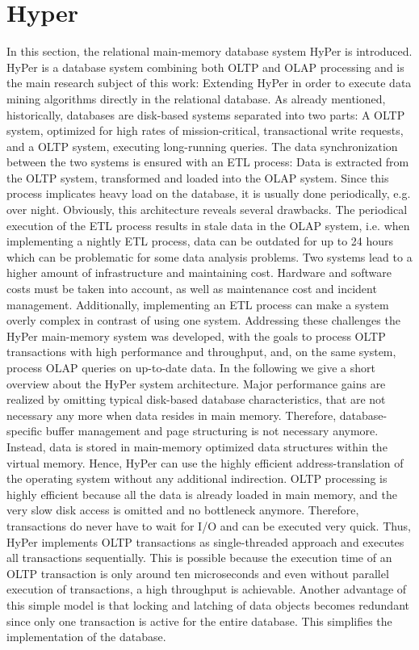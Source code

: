 \chapter{Hyper}\label{chapter:hyper}

In this section, the relational main-memory database system HyPer is introduced. HyPer is a database system combining both OLTP and OLAP processing and is the main research subject of this work: Extending HyPer in order to execute data mining algorithms directly in the relational database.
As already mentioned, historically, databases are disk-based systems separated into two parts: A OLTP system, optimized for high rates of mission-critical, transactional write requests, and a OLTP system, executing long-running queries. The data synchronization between the two systems is ensured with an ETL process: Data is extracted from the OLTP system, transformed and loaded into the OLAP system. Since this process implicates heavy load on the database, it is usually done periodically, e.g. over night. 
Obviously, this architecture reveals several drawbacks. The periodical execution of the ETL process results in stale data in the OLAP system, i.e. when implementing a nightly ETL process, data can be outdated for up to 24 hours which can be problematic for some data analysis problems. Two systems lead to a higher amount of infrastructure and maintaining cost. Hardware and software costs must be taken into account, as well as maintenance cost and incident management. Additionally, implementing an ETL process can make a system overly complex in contrast of using one system.
Addressing these challenges the HyPer main-memory system was developed, with the goals to process OLTP transactions with high performance and throughput, and, on the same system, process OLAP queries on up-to-date data. In the following we give a short overview about the HyPer system architecture.
Major performance gains are realized by omitting typical disk-based database characteristics, that are not necessary any more when data resides in main memory. Therefore, database-specific buffer management and page structuring is not necessary anymore. Instead, data is stored in main-memory optimized data structures within the virtual memory. Hence, HyPer can use the highly efficient address-translation of the operating system without any additional indirection.
OLTP processing is highly efficient because all the data is already loaded in main memory, and the very slow disk access is omitted and no bottleneck anymore. Therefore, transactions do never have to wait for I/O and can be executed very quick. Thus, HyPer implements OLTP transactions as single-threaded approach and executes all transactions sequentially. This is possible because the execution time of an OLTP transaction is only around ten microseconds and even without parallel execution of transactions, a high throughput is achievable. Another advantage of this simple model is that locking and latching of data objects becomes redundant since only one transaction is active for the entire database. This simplifies the implementation of the database.
